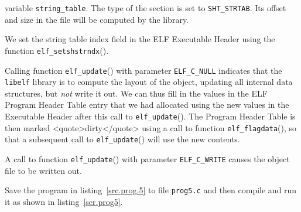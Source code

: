 \documentclass[a4paper]{book}
\makeatletter
\newcommand{\constant}[1]{\texttt{#1}}
\newcommand{\function}[1]{\texttt{#1}()}
\newcommand{\filename}[1]{\texttt{#1}}
\newcommand{\library}[1]{\texttt{#1}}
\newcommand{\parameter}[1]{\texttt{#1}}
\newenvironment{callout}[2][blue]{%
  \begingroup\newcommand{\@cocolor}{#1}%
  \newcommand{\@cogroup}[1]{#2}}{\endgroup}
\newcommand{\@co}[1]{\framebox{\textbf{\color{\@cocolor}#1}}}
\newcommand{\coref}[1]{%
  \hypertarget{\@cogroup.#1.cr}{%
    \hyperlink{\@cogroup.#1.co}{\@co{#1}}}}
\makeatother
\begin{document}
\begin{callout}{prog5}
\begin{description}
      variable \parameter{string\_table}.  The type of the section is
      set to \constant{SHT\_STRTAB}.  Its offset and size in the file
      will be computed by the library.
    \item[\coref{10}] We set the string table index field in the ELF
      Executable Header using the function
      \function{elf\_setshstrndx}.
    \item[\coref{11}] Calling function \function{elf\_update} with
      parameter \constant{ELF\_C\_NULL} indicates that the
      \library{libelf} library is to compute the layout of the object,
      updating all internal data structures, but \emph{not} write it
      out.  We can thus fill in the values in the ELF Program Header
      Table entry that we had allocated using the new values in the
      Executable Header after this call to \function{elf\_update}.
      The Program Header Table is then marked <quote>dirty</quote>
      using a call to function \function{elf\_flagdata}, so that a
      subsequent call to \function{elf\_update} will use the new
      contents.
    \item[\coref{12}] A call to function \function{elf\_update} with
      parameter \constant{ELF\_C\_WRITE} causes the object file to be
      written out.
  \end{description}
\end{callout}

Save the program in listing~\vref{src.prog.5} to file
\filename{prog5.c} and then compile and run it as shown in
listing~\vref{scr.prog5}.
\end{document}
